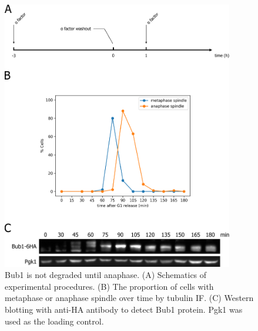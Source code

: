 \begin{figure}[htbp]
  \centering
  \includegraphics[width=0.9\textwidth]{chapter3/figures/Bub1-6HA time course.pdf}
  \caption[Bub1 is not degraded until anaphase]{Bub1 is not degraded until anaphase. (A) Schematics of experimental procedures. (B) The proportion of cells with metaphase or anaphase spindle over time by tubulin IF. (C) Western blotting with anti-HA antibody to detect Bub1 protein. Pgk1 was used as the loading control.}
  \label{fig:bub1timecourse}
\end{figure} 

